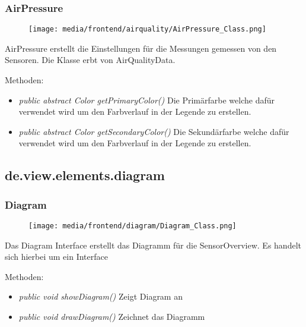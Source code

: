 \subsubsection{AirPressure}
\begin{minipage}{0.3\textwidth}
    \begin{figure}[H]
        \texttt{[image: media/frontend/airquality/AirPressure\_Class.png]}
    \end{figure}
    \end{minipage} \hfill
    \begin{minipage}{0.6\textwidth}
AirPressure erstellt die Einstellungen für die Messungen gemessen von den Sensoren. Die Klasse erbt von AirQualityData.
\end{minipage}

Methoden:
\begin{itemize} 
    \item \emph{public abstract Color getPrimaryColor()} Die Primärfarbe welche dafür verwendet wird um den Farbverlauf in der Legende zu erstellen.
    \item \emph{public abstract Color getSecondaryColor()} Die Sekundärfarbe welche dafür verwendet wird um den Farbverlauf in der Legende zu erstellen.
\end{itemize}


\subsection{de.view.elements.diagram}

\subsubsection{Diagram}
\begin{minipage}{0.3\textwidth}
    \begin{figure}[H]
        \texttt{[image: media/frontend/diagram/Diagram\_Class.png]}
    \end{figure}
    \end{minipage} \hfill
    \begin{minipage}{0.6\textwidth}
Das Diagram Interface erstellt das Diagramm für die SensorOverview. Es handelt sich hierbei um ein Interface
\end{minipage}

Methoden:
\begin{itemize} 
    \item \emph{public void showDiagram()} Zeigt Diagram an
    \item \emph{public void drawDiagram()} Zeichnet das Diagramm
\end{itemize}


